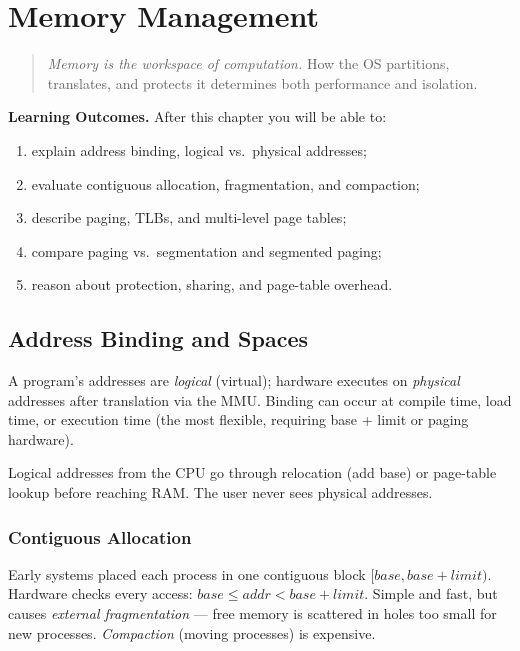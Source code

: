 \chapter{Memory Management}
\label{ch:memory}

\begin{quote}
\emph{Memory is the workspace of computation.} How the OS partitions, translates,
and protects it determines both performance and isolation.
\end{quote}

\noindent\textbf{Learning Outcomes.} After this chapter you will be able to:
\begin{enumerate}[label=(L\arabic*)]
  \item explain address binding, logical vs.\ physical addresses;
  \item evaluate contiguous allocation, fragmentation, and compaction;
  \item describe paging, TLBs, and multi-level page tables;
  \item compare paging vs.\ segmentation and segmented paging;
  \item reason about protection, sharing, and page-table overhead.
\end{enumerate}

\section{Address Binding and Spaces}
\label{sec:binding}

A program's addresses are \emph{logical} (virtual); hardware executes on
\emph{physical} addresses after translation via the MMU. Binding can occur at
compile time, load time, or execution time (the most flexible, requiring base +
limit or paging hardware).

Logical addresses from the CPU go through relocation (add base) or page-table
lookup before reaching RAM. The user never sees physical addresses.

\subsection{Contiguous Allocation}
Early systems placed each process in one contiguous block $[base, base+limit)$.
Hardware checks every access: $base \le addr < base+limit$. Simple and fast,
but causes \emph{external fragmentation} --- free memory is scattered in holes
too small for new processes. \emph{Compaction} (moving processes) is expensive.

